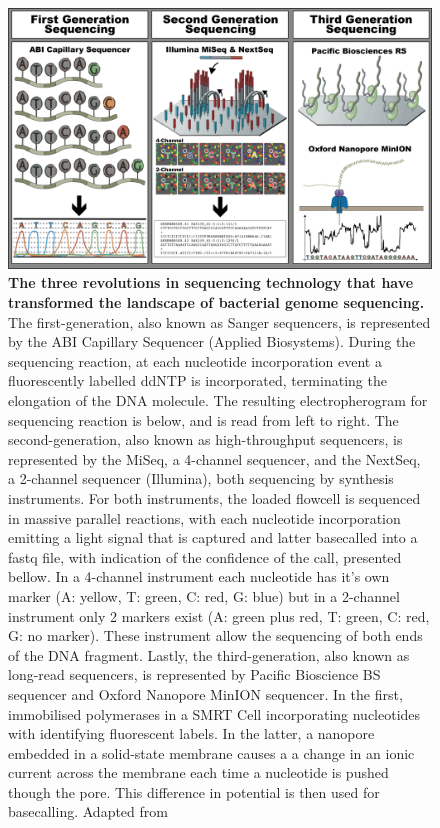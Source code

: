 \begin{figure}[h!]
\centering
\includegraphics[width=\textwidth]{figures/introduction/Figure 5.png}
\caption{\textbf{The three revolutions in sequencing technology that have transformed the landscape of bacterial genome sequencing.} The first-generation, also known as Sanger sequencers, is represented by the ABI Capillary Sequencer (Applied Biosystems). During the sequencing reaction, at each nucleotide incorporation event a fluorescently labelled ddNTP is incorporated, terminating the elongation of the DNA molecule. The resulting electropherogram for sequencing reaction is below, and is read from left to right. The second-generation, also known as high-throughput sequencers, is represented by the MiSeq, a 4-channel sequencer, and the NextSeq, a 2-channel sequencer (Illumina), both sequencing by synthesis instruments. For both instruments, the loaded flowcell is sequenced in massive parallel reactions, with each nucleotide incorporation emitting a light signal that is captured and latter basecalled into a fastq file, with indication of the confidence of the call, presented bellow. In a 4-channel instrument each nucleotide has it's own marker (A: yellow, T: green, C: red, G: blue) but in a 2-channel instrument only 2 markers exist (A: green plus red, T: green, C: red, G: no marker). These instrument allow the sequencing of both ends of the DNA fragment. Lastly, the third-generation, also known as long-read sequencers, is represented by Pacific Bioscience BS sequencer and Oxford Nanopore MinION sequencer. In the first, immobilised polymerases in a SMRT Cell incorporating nucleotides with identifying fluorescent labels. In the latter, a nanopore embedded in a solid-state membrane causes a a change in an ionic current across the membrane each time a nucleotide is pushed though the pore. This difference in potential is then used for basecalling. Adapted from \cite{hagemann_overview_2015, loman_twenty_2015,goodwin_coming_2016, wang_nanopore_2021, metzker_sequencing_2010, xu_recent_2020}}
\label{fig:figure5}
\end{figure}

